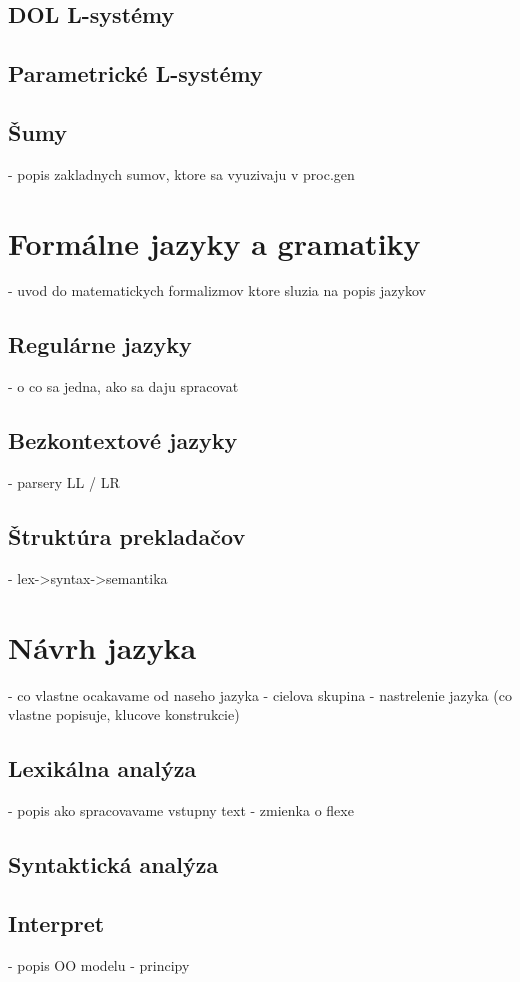 \section{DOL L-systémy}\label{dollsystems}
\section{Parametrické L-systémy}\label{parametric}
\section{Šumy}
		- popis zakladnych sumov, ktore sa vyuzivaju v proc.gen

\chapter{Formálne jazyky a gramatiky}
	- uvod do matematickych formalizmov ktore sluzia na popis jazykov
\section{Regulárne jazyky}
		- o co sa jedna, ako sa daju spracovat
\section{Bezkontextové jazyky}
		- parsery LL / LR
\section{Štruktúra prekladačov}
		- lex->syntax->semantika

\chapter{Návrh jazyka}
	- co vlastne ocakavame od naseho jazyka
	- cielova skupina
	- nastrelenie jazyka (co vlastne popisuje, klucove konstrukcie)
\section{Lexikálna analýza}
		- popis ako spracovavame vstupny text
		- zmienka o flexe	
\section{Syntaktická analýza}
\section{Interpret}
		- popis OO modelu
		- principy
	
